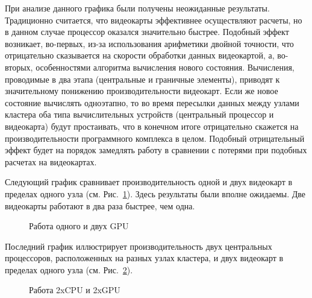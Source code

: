\documentclass[a4paper, 14pt]{extarticle}
\theoremstyle{definition}
\begin{document}
\par При анализе данного графика были получены неожиданные результаты. Традиционно считается, что видеокарты эффективнее осуществляют расчеты, но в данном случае процессор оказался значительно быстрее. Подобный эффект возникает, во-первых, из-за использования арифметики двойной точности, что отрицательно сказывается на скорости обработки данных видеокартой, а, во-вторых, особенностями алгоритма вычисления нового состояния. Вычисления, проводимые в два этапа (центральные и граничные элементы), приводят к значительному понижению производительности видеокарт. Если же новое состояние вычислять одноэтапно, то во время пересылки данных между узлами кластера оба типа вычислительных устройств (центральный процессор и видеокарта) будут простаивать, что в конечном итоге отрицательно скажется на производительности программного комплекса в целом. Подобный отрицательный эффект будет на порядок замедлять работу в сравнении с потерями при подобных расчетах на видеокартах.

\par Следующий график сравнивает производительность одной и двух видеокарт в пределах одного узла (см. Рис.~\ref{ris:gpu_1_2}). Здесь результаты были вполне ожидаемы. Две видеокарты работают в два раза быстрее, чем одна.
\begin{figure}[h]
	\caption{Работа одного и двух GPU}
	\label{ris:gpu_1_2}
\end{figure}

\par Последний график иллюстрирует производительность двух центральных процессоров, расположенных на разных узлах кластера, и двух видеокарт в пределах одного узла (см. Рис.~\ref{ris:cpu_2_gpu_2}).
\begin{figure}[h]
	\caption{Работа 2xCPU и 2xGPU}
	\label{ris:cpu_2_gpu_2}
\end{figure}
\end{document}
